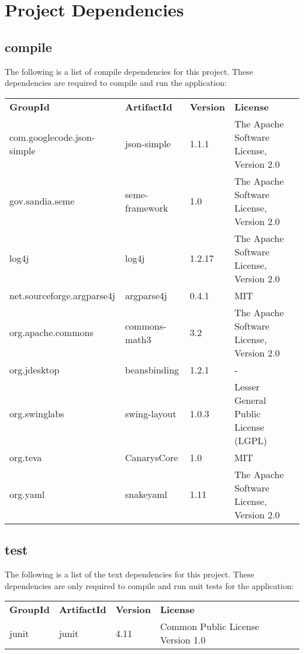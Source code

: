 \section{Project Dependencies}
\subsection{compile}
The following is a list of compile dependencies for this project. These dependencies are required to compile and run the application:

\begin{tabular}{lllll}
\textbf{GroupId} & \textbf{ArtifactId} & \textbf{Version} & \textbf{License} \\
com.googlecode.json-simple & json-simple & 1.1.1  & The Apache Software License, Version 2.0\\
gov.sandia.seme & seme-framework & 1.0  & The Apache Software License, Version 2.0\\
log4j & log4j & 1.2.17  & The Apache Software License, Version 2.0\\
net.sourceforge.argparse4j & argparse4j & 0.4.1  & MIT\\
org.apache.commons & commons-math3 & 3.2  & The Apache Software License, Version 2.0\\
org.jdesktop & beansbinding & 1.2.1  & -\\
org.swinglabs & swing-layout & 1.0.3  & Lesser General Public License (LGPL)\\
org.teva & CanarysCore & 1.0  & MIT \\
org.yaml & snakeyaml & 1.11  & The Apache Software License, Version 2.0\\
\end{tabular}

\subsection{test}
The following is a list of the text dependencies for this project. These dependencies are only required to compile and run unit tests for the application:

\begin{tabular}{lllll}
\textbf{GroupId} & \textbf{ArtifactId} & \textbf{Version} & \textbf{License} \\
junit & junit & 4.11  & Common Public License Version 1.0 \\
\end{tabular}
